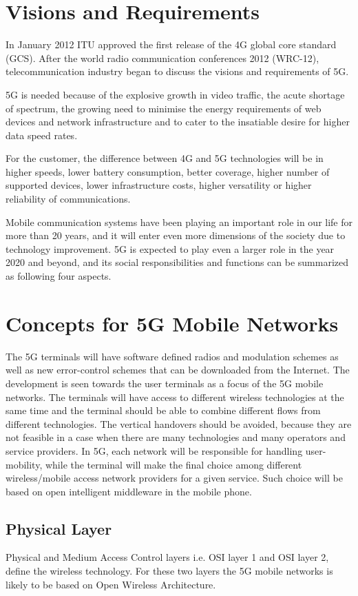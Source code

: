 \documentclass[conference]{IEEEtran}
\begin{document}
\section{Visions and Requirements}
In January 2012 ITU approved the first release of the 4G global core standard (GCS). After the world radio communication conferences 2012 (WRC-12), telecommunication industry began to discuss the visions and requirements of 5G.
\par
5G is needed because of the explosive growth in video traffic, the acute shortage of spectrum, the growing need to minimise the energy requirements of web devices and network infrastructure and to cater to the insatiable desire
for higher data speed rates.
\par
For the customer, the difference between 4G and 5G technologies will be in higher speeds, lower battery consumption, better coverage, higher number of supported devices, lower infrastructure costs, higher versatility or higher reliability of communications.
\par
Mobile communication systems have been playing an important role in our life for more than 20 years, and it
will enter even more dimensions of the society due to technology improvement. 5G is expected to play even a
larger role in the year 2020 and beyond, and its social responsibilities and functions can be summarized as
following four aspects.
\section{Concepts for 5G Mobile Networks}
The 5G terminals will have software defined radios and modulation schemes as well as new error-control schemes that can be downloaded from the Internet. The development is seen towards the user terminals as a focus of the 5G mobile networks. The terminals will have access to different wireless technologies at the same time and the terminal should be able to combine different flows from different technologies. The vertical handovers should be avoided, because they are not feasible in a case when there are many technologies and many operators and service providers. In 5G, each network will be responsible for handling user-mobility, while the terminal will make the final choice among different wireless/mobile access network providers for a given service. Such choice will be based on open intelligent middleware in the mobile phone.
\subsection{Physical Layer}
Physical and Medium Access Control layers i.e. OSI layer 1 and OSI layer 2, define the wireless technology. For these two layers the 5G mobile networks is likely to be based on Open Wireless Architecture.
\end{document}
